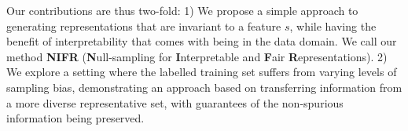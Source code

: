 

Our contributions are thus two-fold: 
%
1) We propose a simple approach to generating representations that are invariant to a feature $s$,
while having the benefit of interpretability that comes with being in the data domain. 
%
We call our method \textbf{NIFR} (\textbf{N}ull-sampling for \textbf{I}nterpretable and \textbf{F}air
\textbf{R}epresentations).
%
2) We explore a setting where the labelled training set suffers from varying levels of sampling
bias, demonstrating an approach based on transferring information from a more diverse
representative set, with guarantees of the non-spurious information being preserved.
